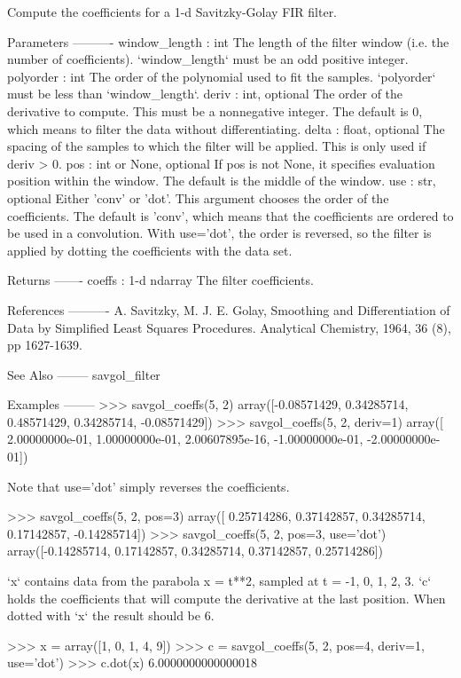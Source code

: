 \begin{DoxyVerb}Compute the coefficients for a 1-d Savitzky-Golay FIR filter.

Parameters
----------
window_length : int
    The length of the filter window (i.e. the number of coefficients).
    `window_length` must be an odd positive integer.
polyorder : int
    The order of the polynomial used to fit the samples.
    `polyorder` must be less than `window_length`.
deriv : int, optional
    The order of the derivative to compute.  This must be a
    nonnegative integer.  The default is 0, which means to filter
    the data without differentiating.
delta : float, optional
    The spacing of the samples to which the filter will be applied.
    This is only used if deriv > 0.
pos : int or None, optional
    If pos is not None, it specifies evaluation position within the
    window.  The default is the middle of the window.
use : str, optional
    Either 'conv' or 'dot'.  This argument chooses the order of the
    coefficients.  The default is 'conv', which means that the
    coefficients are ordered to be used in a convolution.  With
    use='dot', the order is reversed, so the filter is applied by
    dotting the coefficients with the data set.

Returns
-------
coeffs : 1-d ndarray
    The filter coefficients.

References
----------
A. Savitzky, M. J. E. Golay, Smoothing and Differentiation of Data by
Simplified Least Squares Procedures. Analytical Chemistry, 1964, 36 (8),
pp 1627-1639.

See Also
--------
savgol_filter

Examples
--------
>>> savgol_coeffs(5, 2)
array([-0.08571429,  0.34285714,  0.48571429,  0.34285714, -0.08571429])
>>> savgol_coeffs(5, 2, deriv=1)
array([  2.00000000e-01,   1.00000000e-01,   2.00607895e-16,
        -1.00000000e-01,  -2.00000000e-01])

Note that use='dot' simply reverses the coefficients.

>>> savgol_coeffs(5, 2, pos=3)
array([ 0.25714286,  0.37142857,  0.34285714,  0.17142857, -0.14285714])
>>> savgol_coeffs(5, 2, pos=3, use='dot')
array([-0.14285714,  0.17142857,  0.34285714,  0.37142857,  0.25714286])

`x` contains data from the parabola x = t**2, sampled at
t = -1, 0, 1, 2, 3.  `c` holds the coefficients that will compute the
derivative at the last position.  When dotted with `x` the result should
be 6.

>>> x = array([1, 0, 1, 4, 9])
>>> c = savgol_coeffs(5, 2, pos=4, deriv=1, use='dot')
>>> c.dot(x)
6.0000000000000018
\end{DoxyVerb}
 \hypertarget{namespacescipy_1_1signal_1_1__savitzky__golay_a695e7ebdb5efff61216a14bb20a0e980}{}
